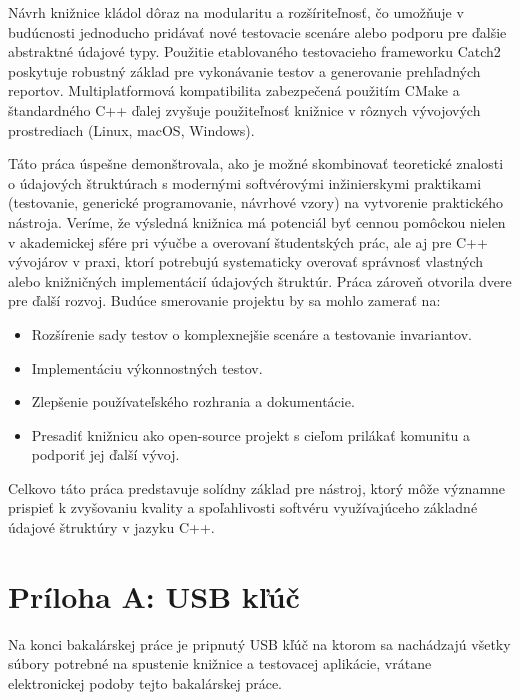 \documentclass[11pt]{article}
\begin{document}
Návrh knižnice kládol dôraz na modularitu a rozšíriteľnosť, čo umožňuje v budúcnosti jednoducho pridávať nové testovacie scenáre alebo podporu pre ďalšie abstraktné údajové typy. Použitie etablovaného testovacieho frameworku Catch2 poskytuje robustný základ pre vykonávanie testov a generovanie prehľadných reportov. Multiplatformová kompatibilita zabezpečená použitím CMake a štandardného C++ ďalej zvyšuje použiteľnosť knižnice v rôznych vývojových prostrediach (Linux, macOS, Windows).

Táto práca úspešne demonštrovala, ako je možné skombinovať teoretické znalosti o údajových štruktúrach s modernými softvérovými inžinierskymi praktikami (testovanie, generické programovanie, návrhové vzory) na vytvorenie praktického nástroja. Veríme, že výsledná knižnica má potenciál byť cennou pomôckou nielen v akademickej sfére pri výučbe a overovaní študentských prác, ale aj pre C++ vývojárov v praxi, ktorí potrebujú systematicky overovať správnosť vlastných alebo knižničných implementácií údajových štruktúr. Práca zároveň otvorila dvere pre ďalší rozvoj. Budúce smerovanie projektu by sa mohlo zamerať na:

\begin{itemize}
  \item Rozšírenie sady testov o komplexnejšie scenáre a testovanie invariantov.
  \item Implementáciu výkonnostných testov.
  \item Zlepšenie používateľského rozhrania a dokumentácie.
  \item Presadiť knižnicu ako open-source projekt s cieľom prilákať komunitu a podporiť jej ďalší vývoj.
\end{itemize}

Celkovo táto práca predstavuje solídny základ pre nástroj, ktorý môže významne prispieť k zvyšovaniu kvality a spoľahlivosti softvéru využívajúceho základné údajové štruktúry v jazyku C++.

\printbibliography[title={Zoznam použitej literatúry}]

\appendix

\newpage
\section*{Príloha A: USB kľúč}
\label{priloha:a}

Na konci bakalárskej práce je pripnutý USB kľúč na ktorom sa nachádzajú všetky súbory potrebné na spustenie knižnice a testovacej aplikácie, vrátane elektronickej podoby tejto bakalárskej práce.
\end{document}

